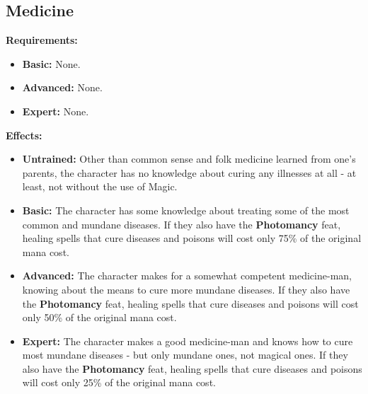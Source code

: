 \subsection{Medicine}
\begin{table}[!ht]
\centering
{}
\end{table}
\textbf{Requirements:}
\begin{itemize}
	\item \textbf{Basic:} None.
	\item \textbf{Advanced:} None.
	\item \textbf{Expert:} None.
\end{itemize}
\textbf{Effects:}
\begin{itemize}
	\item \textbf{Untrained:} Other than common sense  and folk medicine learned from one's parents, the character has no knowledge about curing any illnesses at all - at least, not without the use of Magic.
	\item \textbf{Basic:} The character has some knowledge about treating some of the most common and mundane diseases. If they also have the \textbf{Photomancy} feat, healing spells that cure diseases and poisons will cost only 75\% of the original mana cost.
	\item \textbf{Advanced:} The character makes for a somewhat competent medicine-man, knowing about the means to cure more mundane diseases. If they also have the \textbf{Photomancy} feat, healing spells that cure diseases and poisons will cost only 50\% of the original mana cost.
	\item \textbf{Expert:} The character makes a good medicine-man and knows how to cure most mundane diseases - but only mundane ones, not magical ones. If they also have the \textbf{Photomancy} feat, healing spells that cure diseases and poisons will cost only 25\% of the original mana cost.
\end{itemize}\newpage
